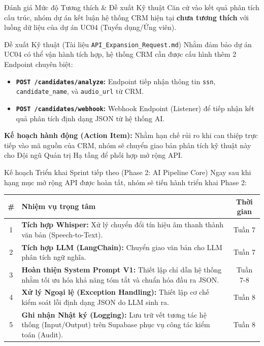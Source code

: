 \begin{frame}{Đánh giá Mức độ Tương thích \& Đề xuất Kỹ thuật}
    Căn cứ vào kết quả phân tích cấu trúc, nhóm dự án kết luận hệ thống CRM hiện tại \textbf{chưa tương thích} với luồng dữ liệu của dự án UC04 (Tuyển dụng/Ứng viên).
    
    \begin{exampleblock}{Đề xuất Kỹ thuật (Tài liệu \texttt{API\_Expansion\_Request.md})}
        Nhằm đảm bảo dự án UC04 có thể vận hành tích hợp, hệ thống CRM cần được cấu hình thêm 2 Endpoint chuyên biệt:
        \begin{itemize}
            \item \textbf{\texttt{POST /candidates/analyze}:} Endpoint tiếp nhận thông tin \texttt{ssn}, \texttt{candidate\_name}, và \texttt{audio\_url} từ CRM.
            \item \textbf{\texttt{POST /candidates/webhook}:} Webhook Endpoint (Listener) để tiếp nhận kết quả phân tích định dạng JSON từ hệ thống AI.
        \end{itemize}
    \end{exampleblock}
    
    \textbf{Kế hoạch hành động (Action Item):} Nhằm hạn chế rủi ro khi can thiệp trực tiếp vào mã nguồn của CRM, nhóm sẽ chuyển giao bản phân tích kỹ thuật này cho Đội ngũ Quản trị Hạ tầng để phối hợp mở rộng API.
\end{frame}

\begin{frame}{Kế hoạch Triển khai Sprint tiếp theo (Phase 2: AI Pipeline Core)}
    Ngay sau khi hạng mục mở rộng API được hoàn tất, nhóm sẽ tiến hành triển khai Phase 2:
    
    \begin{table}[]
        \centering
        \renewcommand{\arraystretch}{1.3}
        \begin{tabular}{|c|p{7cm}|c|}
            \hline
            \textbf{\#} & \textbf{Nhiệm vụ trọng tâm} & \textbf{Thời gian} \\ \hline
            1 & \textbf{Tích hợp Whisper:} Xử lý chuyển đổi tín hiệu âm thanh thành văn bản (Speech-to-Text). & Tuần 7 \\ \hline
            2 & \textbf{Tích hợp LLM (LangChain):} Chuyển giao văn bản cho LLM phân tích ngữ nghĩa. & Tuần 7 \\ \hline
            3 & \textbf{Hoàn thiện System Prompt V1:} Thiết lập chỉ dẫn hệ thống nhằm tối ưu hóa khả năng tóm tắt và chuẩn hóa đầu ra JSON. & Tuần 7-8 \\ \hline
            4 & \textbf{Xử lý Ngoại lệ (Exception Handling):} Thiết lập cơ chế kiểm soát lỗi định dạng JSON do LLM sinh ra. & Tuần 8 \\ \hline
            5 & \textbf{Ghi nhận Nhật ký (Logging):} Lưu trữ vết tương tác hệ thống (Input/Output) trên Supabase phục vụ công tác kiểm toán (Audit). & Tuần 8 \\ \hline
        \end{tabular}
    \end{table}
\end{frame}
